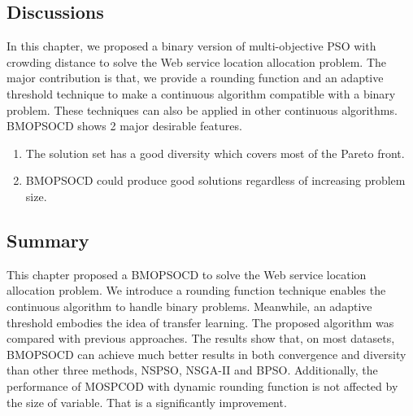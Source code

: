 \subsection{Discussions}
In this chapter, we proposed a binary version of multi-objective PSO with crowding distance to solve the Web service location allocation problem.
The major contribution is that, we provide a rounding function and an adaptive threshold technique to make a continuous algorithm compatible with a binary problem.
These techniques can also be applied in other continuous algorithms.
BMOPSOCD shows 2 major desirable features. 
\begin{enumerate}
	\item The solution set has a good diversity which covers most of the Pareto front.
	\item BMOPSOCD could produce good solutions regardless of increasing problem size.
\end{enumerate}

\subsection{Summary}
This chapter proposed a BMOPSOCD to solve the Web service location allocation problem. We introduce a rounding function technique 
enables the continuous algorithm to handle binary problems. Meanwhile, an adaptive threshold embodies the idea of transfer
learning.
The proposed algorithm was compared with previous approaches. The results show that, on most datasets, BMOPSOCD can achieve much better results in both convergence and diversity than other three
methods, NSPSO, NSGA-II and BPSO. Additionally, the performance of MOSPCOD with dynamic rounding function is not affected by the size of variable. That is
a significantly improvement.


